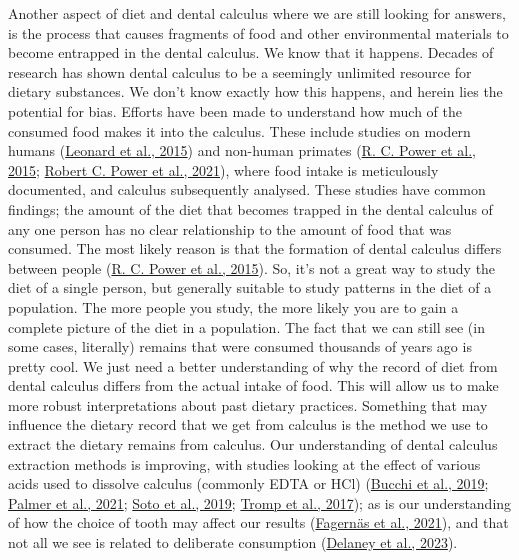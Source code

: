 \documentclass[
  b5paper,
]{book}
\begin{document}
Another aspect of diet and dental calculus where we are still looking
for answers, is the process that causes fragments of food and other
environmental materials to become entrapped in the dental calculus. We
know that it happens. Decades of research has shown dental calculus to
be a seemingly unlimited resource for dietary substances. We don't know
exactly how this happens, and herein lies the potential for bias.
Efforts have been made to understand how much of the consumed food makes
it into the calculus. These include studies on modern humans
(\protect\hyperlink{ref-leonardPlantMicroremains2015}{Leonard et al.,
2015}) and non-human primates
(\protect\hyperlink{ref-powerChimpCalculus2015}{R. C. Power et al.,
2015}; \protect\hyperlink{ref-powerRepresentativenessDental2021}{Robert
C. Power et al., 2021}), where food intake is meticulously documented,
and calculus subsequently analysed. These studies have common findings;
the amount of the diet that becomes trapped in the dental calculus of
any one person has no clear relationship to the amount of food that was
consumed. The most likely reason is that the formation of dental
calculus differs between people
(\protect\hyperlink{ref-powerChimpCalculus2015}{R. C. Power et al.,
2015}). So, it's not a great way to study the diet of a single person,
but generally suitable to study patterns in the diet of a population.
The more people you study, the more likely you are to gain a complete
picture of the diet in a population. The fact that we can still see (in
some cases, literally) remains that were consumed thousands of years ago
is pretty cool. We just need a better understanding of why the record of
diet from dental calculus differs from the actual intake of food. This
will allow us to make more robust interpretations about past dietary
practices. Something that may influence the dietary record that we get
from calculus is the method we use to extract the dietary remains from
calculus. Our understanding of dental calculus extraction methods is
improving, with studies looking at the effect of various acids used to
dissolve calculus (commonly EDTA or HCl)
(\protect\hyperlink{ref-bucchiComparisonsMethods2019}{Bucchi et al.,
2019}; \protect\hyperlink{ref-palmerComparingUse2021}{Palmer et al.,
2021};
\protect\hyperlink{ref-sotoCharacterizationDecontamination2019}{Soto et
al., 2019}; \protect\hyperlink{ref-trompEDTACalculus2017}{Tromp et al.,
2017}); as is our understanding of how the choice of tooth may affect
our results
(\protect\hyperlink{ref-fagernasMicrobialBiogeography2021}{Fagernäs et
al., 2021}), and that not all we see is related to deliberate
consumption (\protect\hyperlink{ref-delaneyMoreWhat2023}{Delaney et al.,
2023}).
\end{document}
